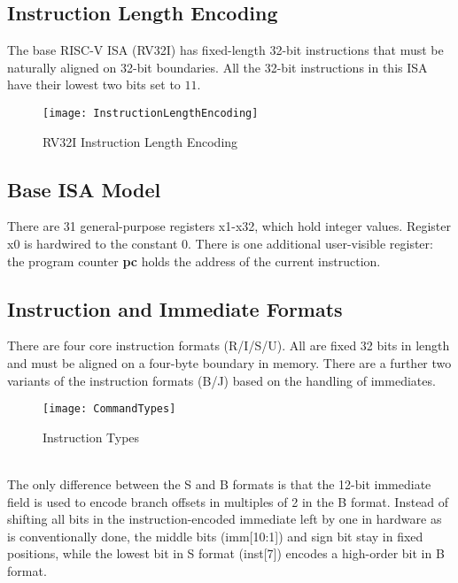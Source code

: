 	\subsection{Instruction Length Encoding}
	\label{subsec:ILE}
	The base RISC-V ISA (RV32I) has fixed-length 32-bit instructions that must be naturally aligned on 32-bit boundaries. All the 32-bit instructions in this ISA have their lowest two bits set to $11$.
	\vspace{3mm}
	\begin{figure}[h!]
		
		\begin{center}
		\texttt{[image: InstructionLengthEncoding]}
		\caption{RV32I Instruction Length Encoding}
		\label{image2.1}
		\end{center}
	\end{figure}
	\subsection{Base ISA Model}
	\label{subsec:ISA Model}
	There are 31 general-purpose registers x1-x32, which hold integer values. Register x0 is hardwired to the constant 0. There is one additional user-visible register: the program counter \textbf{pc} holds the address of the current instruction.
	\subsection{Instruction and Immediate Formats} \label{sect2.3.3}
	There are four core instruction formats (R/I/S/U). All are fixed 32 bits in length and must be        aligned on a four-byte boundary in memory. There are a further two variants of the instruction formats (B/J) based on the handling of immediates.\\
	\begin{figure}[h!]
		
		\begin{center}
			\texttt{[image: CommandTypes]}
			\caption{Instruction Types}
			\label{Image2.2}
		\end{center}
	\end{figure}
	\\

	The only difference between the S and B formats is that the 12-bit immediate field is used to encode branch offsets in multiples of 2 in the B format. Instead of shifting all bits in the instruction-encoded immediate left by one in hardware as is conventionally done, the middle bits (imm[10:1]) and sign bit stay in fixed positions, while the lowest bit in S format (inst[7]) encodes a high-order bit in B format.
	\\
	
